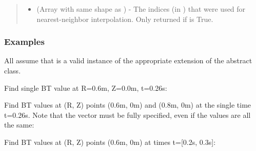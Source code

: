 \documentclass[letterpaper,10pt,english]{sphinxmanual}
\begin{document}
\begin{fulllineitems}
\begin{fulllineitems}
\begin{quote}
\begin{description}
\begin{itemize}
\item {} 
 (Array with same shape as ) - The indices
(in ) that were used for
nearest-neighbor interpolation. Only returned if  is
True.

\end{itemize}


\end{description}\end{quote}
\subsubsection*{Examples}

All assume that  is a valid instance of the
appropriate extension of the {\hyperref[\detokenize{eqtools:eqtools.core.Equilibrium}]{}} abstract class.

Find single BT value at R=0.6m, Z=0.0m, t=0.26s:

\begin{sphinxVerbatim}[commandchars=\\\{\}]
    
\end{sphinxVerbatim}

Find BT values at (R, Z) points (0.6m, 0m) and (0.8m, 0m) at the
single time t=0.26s. Note that the  vector must be fully specified,
even if the values are all the same:

\begin{sphinxVerbatim}[commandchars=\\\{\}]
  \PYG{p}{[} \PYG{p}{]} \PYG{p}{[} \PYG{p}{]} 
\end{sphinxVerbatim}

Find BT values at (R, Z) points (0.6m, 0m) at times t={[}0.2s, 0.3s{]}:

\begin{sphinxVerbatim}[commandchars=\\\{\}]
    \PYG{p}{[} \PYG{p}{]}
\end{sphinxVerbatim}


\end{fulllineitems}
\end{fulllineitems}
\end{document}
